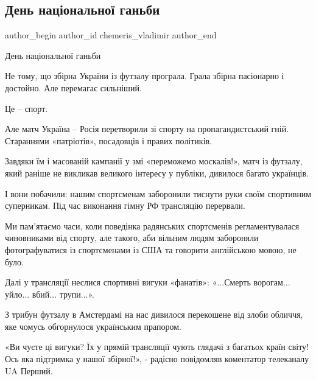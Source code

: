  
 
 
 
 
 
\subsection{День національної ганьби}
\label{sec:04_02_2022.fb.chemeris_vladimir.1.den_nacionalnoj_ganjby}
 
\ifcmt
 author_begin
   author_id chemeris_vladimir
 author_end
\fi

День національної ганьби

Не тому, що збірна України із футзалу програла. Грала збірна пасіонарно і
достойно. Але перемагає сильніший.

Це – спорт. 

Але матч Україна – Росія перетворили зі спорту на пропагандистський гній.
Стараннями «патріотів», посадовців і правих політиків.

Завдяки їм і масованій кампанії у змі «переможемо москалів!», матч із футзалу,
який раніше не викликав великого інтересу у публіки, дивилося багато українців.

І вони побачили: нашим спортсменам заборонили тиснути руки своїм спортивним
суперникам. Під час виконання гімну РФ трансляцію перервали.

Ми пам’ятаємо часи, коли поведінка радянських спортсменів регламентувалася
чиновниками від спорту, але такого, аби вільним людям забороняли
фотографуватися із спортсменами із США та говорити англійською мовою, не було.

Далі у трансляції неслися спортивні вигуки «фанатів»: «...Смерть ворогам...
уйло...  вбий... трупи...».

З трибун футзалу в Амстердамі на нас дивилося перекошене від злоби обличчя, яке
чомусь обгорнулося українським прапором.

«Ви чуєте ці вигуки? Їх у прямій трансляції чують глядачі з багатьох країн
світу! Ось яка підтримка у нашої збірної!», - радісно повідомляв коментатор
телеканалу UA Перший.

